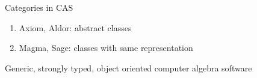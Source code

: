 \documentclass[final]{beamer}
\begin{document}
\begin{frame}[fragile]
\begin{columns}[t]
\begin{column}{.3\linewidth}
  \hfill
  \begin{block}{\large Categories in CAS}
  \scriptsize
  \begin{enumerate}
  \item Axiom, Aldor: abstract classes
  \item Magma, Sage: classes with same representation
  \end{enumerate}
  \end{block}
  \hfill
  \begin{block}{\large Generic, strongly typed, object oriented computer algebra software}
      \centering
  \end{block}
  \hfill
\end{column}


\begin{column}{.3\linewidth}
 

\end{column}
\end{columns}
\end{frame}
\end{document}
